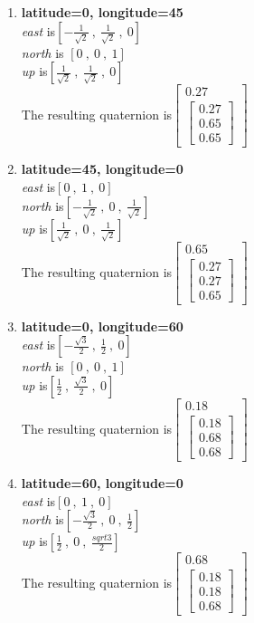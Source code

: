 \documentclass[11pt,fleqn]{report}
\begin{document}
\begin{enumerate}
\item \textbf{latitude=0, longitude=45}\\
\textit{east} is$[-\frac{1}{\sqrt2}~,~\frac{1}{\sqrt2}~,~0]$ \\
\textit{north} is $[0~,~0~,~1]$ \\
\textit{up} is$[\frac{1}{\sqrt2}~,~\frac{1}{\sqrt2}~,~0]$ \\
The resulting quaternion is$
\begin{bmatrix} 0.27 \\
\begin{bmatrix} 0.27 \\
0.65 \\
0.65
\end{bmatrix}
\end{bmatrix}$

\item \textbf{latitude=45, longitude=0}\\
\textit{east} is$[0~,~1~,~0]$ \\
\textit{north} is$[-\frac{1}{\sqrt2}~,~0~,~\frac{1}{\sqrt2}]$ \\
\textit{up} is$[\frac{1}{\sqrt2}~,~0~,~\frac{1}{\sqrt2}]$ \\
The resulting quaternion is$
\begin{bmatrix} 0.65 \\
\begin{bmatrix} 0.27 \\
0.27 \\
0.65
\end{bmatrix}
\end{bmatrix}$

\item \textbf{latitude=0, longitude=60}\\
\textit{east} is$[-\frac{\sqrt3}{2}~,~\frac{1}{2}~,~0]$ \\
\textit{north} is $[0~,~0~,~1]$ \\
\textit{up} is$[\frac{1}{2}~,~\frac{\sqrt3}{2}~,~0]$ \\
The resulting quaternion is$
\begin{bmatrix} 0.18 \\
\begin{bmatrix} 0.18 \\
0.68 \\
0.68
\end{bmatrix}
\end{bmatrix}$

\item \textbf{latitude=60, longitude=0}\\
\textit{east} is$[0~,~1~,~0]$ \\
\textit{north} is$[-\frac{\sqrt3}{2}~,~0~,~\frac{1}{2}]$ \\
\textit{up} is$[\frac{1}{2}~,~0~,~\frac{sqrt3}{2}]$ \\
The resulting quaternion is$
\begin{bmatrix} 0.68 \\
\begin{bmatrix} 0.18 \\
0.18 \\
0.68
\end{bmatrix}
\end{bmatrix}$


\end{enumerate}
\end{document}
